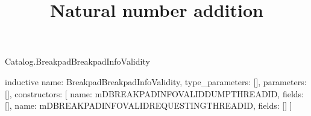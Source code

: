 \begin{lexlean}{Catalog.BreakpadBreakpadInfoValidity}
\title{Natural number addition}
\begin{semanticmodule}
inductive{
  name: BreakpadBreakpadInfoValidity,
  type_parameters: [],
  parameters: [],
  constructors: [
    {name: mDBREAKPADINFOVALIDDUMPTHREADID, fields: []},
    {name: mDBREAKPADINFOVALIDREQUESTINGTHREADID, fields: []}
  ]
}
\end{semanticmodule}
\end{lexlean}
